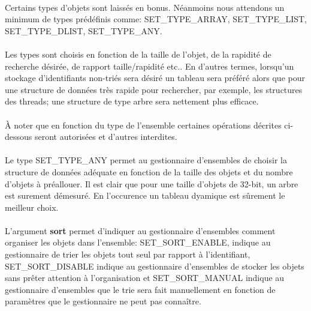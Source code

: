 \documentclass[10pt,a4wide]{article}
\begin{document}
\paragraph{}

Certains types d'objets sont laiss\'es en bonus. N\'eanmoins nous attendons
un minimum de types pr\'ed\'efinis comme: SET\_TYPE\_ARRAY, SET\_TYPE\_LIST,
SET\_TYPE\_DLIST, SET\_TYPE\_ANY.

\paragraph{}

Les types sont choisis en fonction de la taille de l'objet, de la rapidit\'e
de recherche d\'esir\'ee, de rapport taille/rapidit\'e etc.. En d'autres
termes, lorsqu'un stockage d'identifiants non-tri\'es sera d\'esir\'e
un tableau sera pr\'ef\'er\'e alors que pour une structure de donn\'ees
tr\`es rapide pour rechercher, par exemple, les structures des threads; une
structure de type arbre sera nettement plus efficace.

\paragraph{}

\`A noter que en fonction du type de l'ensemble certaines op\'erations
d\'ecrites ci-dessous seront autoris\'ees et d'autres interdites.

\paragraph{}

Le type SET\_TYPE\_ANY permet au gestionnaire d'ensembles de choisir
la structure de donn\'ees ad\'equate en fonction de la taille des objets
et du nombre d'objets \`a pr\'eallouer. Il est clair que pour une taille
d'objets de 32-bit, un arbre est surement d\'emesur\'e. En l'occurence
un tableau dyamique est s\^urement le meilleur choix.

\paragraph{}

L'argument \textbf{sort} permet d'indiquer au gestionnaire d'ensembles
comment organiser les objets dans l'ensemble: SET\_SORT\_ENABLE,
indique au gestionnaire de trier les objets tout seul par rapport \`a
l'identifiant, SET\_SORT\_DISABLE indique au gestionnaire d'ensembles
de stocker les objets sans pr\^eter attention \`a l'organisation et
SET\_SORT\_MANUAL indique au gestionnaire d'ensembles que le trie sera
fait manuellement en fonction de param\`etres que le gestionnaire ne
peut pas conna\^itre.
\end{document}
